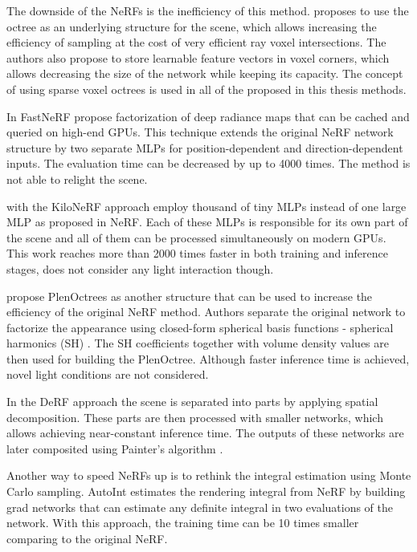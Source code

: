 The downside of the NeRFs is the inefficiency of this method.
\cite{liu2021neural} proposes to use the octree as an underlying structure for the scene,
which allows increasing the efficiency of sampling at the cost of very efficient ray voxel intersections.
The authors also propose to store learnable feature vectors in voxel corners,
which allows decreasing the size of the network while keeping its capacity.
The concept of using sparse voxel octrees is used in all of the proposed in this thesis methods.

In FastNeRF \cite{garbin2021fastnerf} propose factorization of deep radiance maps
that can be cached and queried on high-end GPUs.
This technique extends the original NeRF network structure
by two separate MLPs for position-dependent and direction-dependent inputs.
The evaluation time can be decreased by up to 4000 times.
The method is not able to relight the scene.

\cite{reiser2021kilonerf} with the KiloNeRF approach employ thousand of tiny MLPs 
instead of one large MLP as proposed in NeRF.
Each of these MLPs is responsible for its own part of the scene
and all of them can be processed simultaneously on modern GPUs.
This work reaches more than 2000 times faster in both training and inference stages,
does not consider any light interaction though.

\cite{yu2021plenoctrees} propose PlenOctrees as another structure that can be used to increase the efficiency of the original NeRF method.
Authors separate the original network to factorize the appearance using closed-form
spherical basis functions - spherical harmonics (SH) \cite{mohlenkamp1997spherical}.
The SH coefficients together with volume density values are then used
for building the PlenOctree.
Although faster inference time is achieved, novel light conditions are not considered.

In the DeRF approach \cite{rebain2020derf} the scene is separated into parts by applying spatial decomposition.
These parts are then processed with smaller networks, which allows achieving near-constant inference time.
The outputs of these networks are later composited using Painter's algorithm \cite{deBerg2008}.

Another way to speed NeRFs up is to rethink the integral estimation using Monte Carlo sampling.
AutoInt \cite{lindell2021autoint} estimates the rendering integral from NeRF
by building grad networks that can estimate any definite integral in two evaluations of the network.
With this approach, the training time can be 10 times smaller comparing to the original NeRF.

